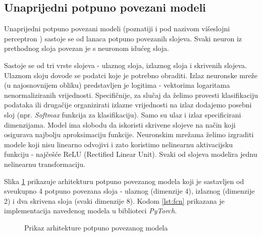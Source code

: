 \subsection{Unaprijedni potpuno povezani modeli}

Unaprijedni potpuno povezani modeli  (poznatiji i pod nazivom višeslojni perceptron ) sastoje se od lanaca potpuno povezanih slojeva. Svaki neuron iz prethodnog sloja povezan je s neuronom idućeg sloja. 

Sastoje se od tri vrste slojeva - ulaznog sloja, izlaznog sloja i skrivenih slojeva. Ulaznom sloju dovode se podatci koje je potrebno obraditi. Izlaz neuronske mreže (u najosnovnijem obliku) predstavljen je logitima  - vektorima logaritama nenormaliziranih vrijednosti. Specifičnije, za slučaj da želimo provesti klasifikaciju podataka ili drugačije organizirati izlazne vrijednosti na izlaz dodajemo posebni sloj (npr. \textit{Softmax} funkcija za klasifikaciju). Samo su ulaz i izlaz specificirani dimenzijama. Model ima slobodu da iskoristi skrivene slojeve na način koji osigurava najbolju aproksimaciju funkcije. Neuronskim mrežama želimo izgraditi modele koji nisu linearno odvojivi i zato koristimo nelinearnu aktivacijsku funkciju - najčešće ReLU (Rectified Linear Unit). Svaki od slojeva modelira jednu nelinearnu transformaciju.

Slika \ref{fig:nn} prikazuje arhitekturu potpuno povezanog modela \cite{NNsvg} koji je sastavljen od sveukupno 4 potpuno povezana sloja - ulaznog (dimenzije 4), izlaznog (dimenzije 2) i dva skrivena sloja (svaki dimenzije 8). Kodom \ref{lst:fcn} prikazana je implementacija navedenog modela u biblioteci \textit{PyTorch}.

\begin{figure}[H]
    \centering
    \caption{Prikaz arhitekture potpuno povezanog modela}
    \label{fig:nn}
\end{figure}

